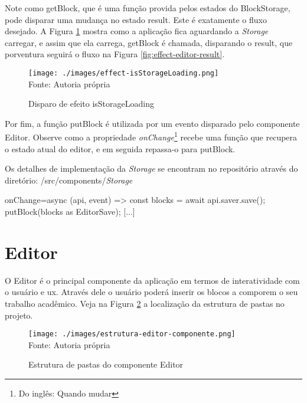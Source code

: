 Note como getBlock, que é uma função provida pelos estados do BlockStorage,
pode disparar uma mudança no estado result. Este é exatamente o fluxo desejado.
A
Figura \ref{fig:effect-isStorageLoading}
mostra como a aplicação fica aguardando a \textit{Storage} carregar, e assim
que ela carrega, getBlock é chamada, disparando o result, que porventura
seguirá o fluxo na
Figura \ref{fig:effect-editor-result}.

\begin{figure}[H]
    \centering
    \caption{Disparo de efeito isStorageLoading}
    \texttt{[image: ./images/effect-isStorageLoading.png]}
    \label{fig:effect-isStorageLoading} \\
    \textnormal{\fontsize{10pt}{12pt}Fonte: Autoria própria}
\end{figure}

Por fim, a função putBlock é utilizada por um evento disparado
pelo componente Editor. Observe como a propriedade
\textit{onChange}\footnote{Do inglês: Quando mudar
}
recebe uma função que recupera o estado atual do editor, e em
seguida repassa-o para putBlock.

Os detalhes de implementação da \textit{Storage} se encontram no repositório através
do diretório: /src/components/\textit{Storage}

\begin{Code818126e5e5a24b7ebd5654e102d93ce1}
[...]
onChange={async (api, event) => {
    const blocks = await api.saver.save();
    putBlock(blocks as EditorSave);
}}
[...]
\end{Code818126e5e5a24b7ebd5654e102d93ce1}

\section{Editor}

O Editor é o principal componente da aplicação em termos de interatividade
com o usuário e
\acrshort{ux}.
Através dele o usuário poderá inserir os blocos a comporem o seu trabalho acadêmico.
Veja na
Figura \ref{fig:estrutura-editor-componente}
a localização da estrutura de pastas no projeto.

\begin{figure}[H]
    \centering
    \caption{Estrutura de pastas do componente Editor}
    \texttt{[image: ./images/estrutura-editor-componente.png]}
    \label{fig:estrutura-editor-componente} \\
    \textnormal{\fontsize{10pt}{12pt}Fonte: Autoria própria}
\end{figure}

